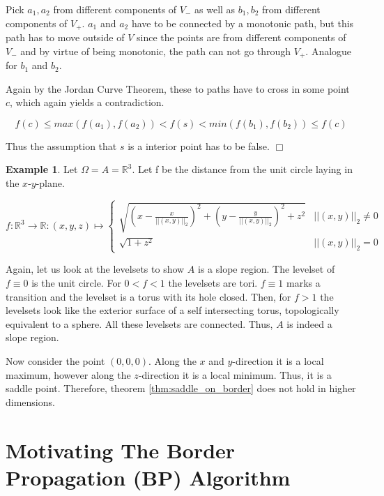 \documentclass[a4paper,12pt,notitlepage,fullpage]{paper}
\theoremstyle{plain}
\theoremstyle{definition}
\newtheorem{exmp}[thm]{Example} %
\begin{document}
Pick $a_1, a_2$ from different components of $V_-$ as well as $b_1, b_2$ from different components of $V_+$.
$a_1$ and $a_2$ have to be connected by a monotonic path, but this path has to move outside of $V$ since the points are from different components of $V_-$ and by virtue of being monotonic, the path can not go through $V_+$.
Analogue for $b_1$ and $b_2$.

Again by the Jordan Curve Theorem, these to paths have to cross in some point $c$, which again yields a contradiction.

\begin{equation*}
f(c) \leq max(f(a_1), f(a_2)) < f(s) < min(f(b_1), f(b_2)) \leq f(c)
\end{equation*}

Thus the assumption that $s$ is a interior point has to be false.
\hfill $\Box$

\begin{exmp}
Let $\Omega = A = \mathbb R^3$.
Let f be the distance from the unit circle laying in the $x$-$y$-plane. 

\begin{equation*}
f: \mathbb R^3 \to \mathbb R: (x,y,z) \mapsto 
\begin{cases}
\sqrt{\left(x - \frac{x}{||\left(x,y\right)||_2}\right)^2 + \left(y - \frac{y}{||\left(x,y\right)||_2}\right)^2 + z^2} & ||(x,y)||_2 \neq 0 \\
\sqrt{1+z^2} & ||(x,y)||_2 = 0
\end{cases}
\end{equation*}

Again, let us look at the levelsets to show $A$ is a slope region.
The levelset of $f \equiv 0$ is the unit circle. For $0 < f < 1$ the levelsets are tori.
$f \equiv 1$ marks a transition and the levelset is a torus with its hole closed.
Then, for $f > 1$ the levelsets look like the exterior surface of a self intersecting torus, topologically equivalent to a sphere.
All these levelsets are connected.
Thus, $A$ is indeed a slope region.

Now consider the point $(0,0,0)$.
Along the $x$ and $y$-direction it is a local maximum, however along the $z$-direction it is a local minimum.
Thus, it is a saddle point.
Therefore, theorem \ref{thm:saddle_on_border} does not hold in higher dimensions.
\end{exmp}


\section{Motivating The Border Propagation (BP) Algorithm}
\label{sec:motivating_BP}
\end{document}
